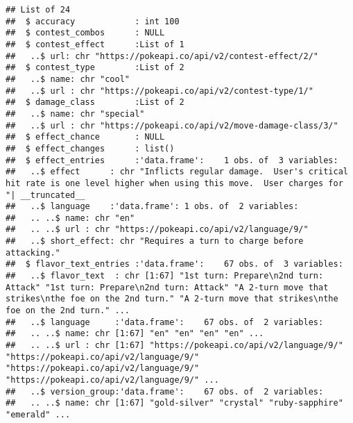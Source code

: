 \documentclass[
  12pt,
]{article}
\newenvironment{Shaded}{\begin{snugshade}}{\end{snugshade}}
\newcommand{\CommentTok}[1]{\textcolor[rgb]{0.56,0.35,0.01}{\textit{#1}}}
\newcommand{\DecValTok}[1]{\textcolor[rgb]{0.00,0.00,0.81}{#1}}
\newcommand{\FunctionTok}[1]{\textcolor[rgb]{0.00,0.00,0.00}{#1}}
\newcommand{\NormalTok}[1]{#1}
\newcommand{\OtherTok}[1]{\textcolor[rgb]{0.56,0.35,0.01}{#1}}
\newcommand{\SpecialCharTok}[1]{\textcolor[rgb]{0.00,0.00,0.00}{#1}}
\newcommand{\StringTok}[1]{\textcolor[rgb]{0.31,0.60,0.02}{#1}}
\begin{document}
\begin{Shaded}
\end{Shaded}

\begin{verbatim}
## List of 24
##  $ accuracy            : int 100
##  $ contest_combos      : NULL
##  $ contest_effect      :List of 1
##   ..$ url: chr "https://pokeapi.co/api/v2/contest-effect/2/"
##  $ contest_type        :List of 2
##   ..$ name: chr "cool"
##   ..$ url : chr "https://pokeapi.co/api/v2/contest-type/1/"
##  $ damage_class        :List of 2
##   ..$ name: chr "special"
##   ..$ url : chr "https://pokeapi.co/api/v2/move-damage-class/3/"
##  $ effect_chance       : NULL
##  $ effect_changes      : list()
##  $ effect_entries      :'data.frame':    1 obs. of  3 variables:
##   ..$ effect      : chr "Inflicts regular damage.  User's critical hit rate is one level higher when using this move.  User charges for "| __truncated__
##   ..$ language    :'data.frame': 1 obs. of  2 variables:
##   .. ..$ name: chr "en"
##   .. ..$ url : chr "https://pokeapi.co/api/v2/language/9/"
##   ..$ short_effect: chr "Requires a turn to charge before attacking."
##  $ flavor_text_entries :'data.frame':    67 obs. of  3 variables:
##   ..$ flavor_text  : chr [1:67] "1st turn: Prepare\n2nd turn: Attack" "1st turn: Prepare\n2nd turn: Attack" "A 2-turn move that strikes\nthe foe on the 2nd turn." "A 2-turn move that strikes\nthe foe on the 2nd turn." ...
##   ..$ language     :'data.frame':    67 obs. of  2 variables:
##   .. ..$ name: chr [1:67] "en" "en" "en" "en" ...
##   .. ..$ url : chr [1:67] "https://pokeapi.co/api/v2/language/9/" "https://pokeapi.co/api/v2/language/9/" "https://pokeapi.co/api/v2/language/9/" "https://pokeapi.co/api/v2/language/9/" ...
##   ..$ version_group:'data.frame':    67 obs. of  2 variables:
##   .. ..$ name: chr [1:67] "gold-silver" "crystal" "ruby-sapphire" "emerald" ...

\end{verbatim}
\end{document}
